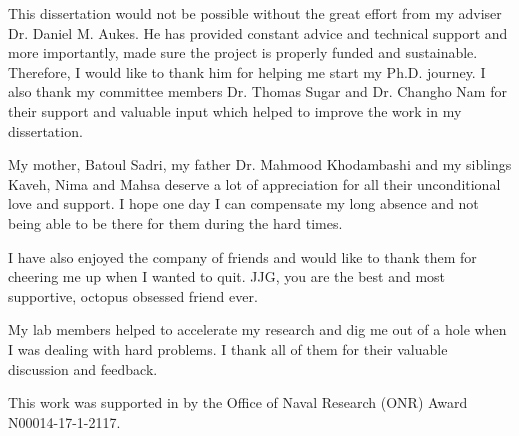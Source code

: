 
\begin{acknowledgements}      

This dissertation would not be possible without the great effort from my adviser Dr. Daniel M. Aukes. He has provided constant advice and technical support and more importantly, made sure the project is properly funded and sustainable. Therefore, I would like to thank him for helping me start my Ph.D. journey. I also thank my committee members Dr. Thomas Sugar and Dr. Changho Nam for their support and valuable input which helped to improve the work in my dissertation.

My mother, Batoul Sadri, my father Dr. Mahmood Khodambashi and my siblings Kaveh, Nima and Mahsa deserve a lot of appreciation for all their unconditional love and support. I hope one day I can compensate my long absence and not being able to be there for them during the hard times.  

I have also enjoyed the company of friends and would like to thank them for cheering me up when I wanted to quit. JJG, you are the best and most supportive, octopus obsessed friend ever.

My lab members helped to accelerate my research and dig me out of a hole when I was dealing with hard problems. I thank all of them for their valuable discussion and feedback.

This work was supported in by the Office of Naval Research (ONR) Award N00014-17-1-2117.

\end{acknowledgements}